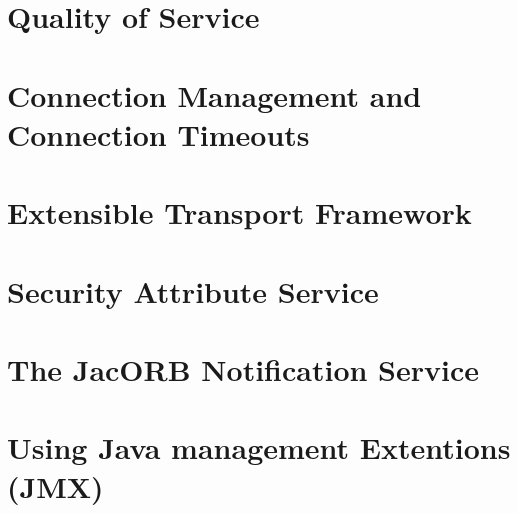 \documentclass[12pt]{scrbook}
\begin{document}



\chapter{Quality of Service}
\label{ch:qos}




\chapter{Connection Management and Connection Timeouts}
\label{ch:connections}




\chapter{Extensible Transport Framework}
\label{ch:etf}




\chapter{Security Attribute Service}
\label{ch:sas}




\chapter{The JacORB Notification Service}
\label{ch:ntfy}




\chapter{Using Java management Extentions (JMX)}
\label{ch:jmx}
\end{document}
